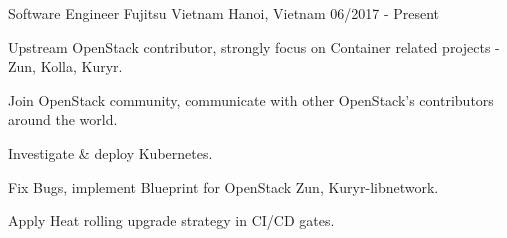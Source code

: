 \begin{cventries}
  \cventry
    {Software Engineer} %
    {Fujitsu Vietnam} %
    {Hanoi, Vietnam} %
    {06/2017 - Present} %
    {
      \begin{cvitems} %
      	\item {Upstream OpenStack contributor, strongly focus on Container related projects - Zun, Kolla, Kuryr.}
      	\item {Join OpenStack community, communicate with other OpenStack's contributors around the world.}{}
        \item {Investigate \& deploy Kubernetes.}
        \item {Fix Bugs, implement Blueprint for OpenStack Zun, Kuryr-libnetwork.}
        \item {Apply Heat rolling upgrade strategy in CI/CD gates.}
      \end{cvitems}
    }

\end{cventries}
